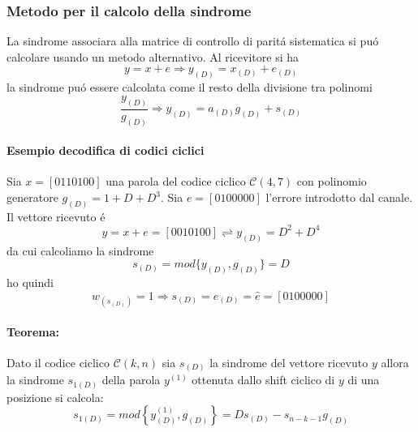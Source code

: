         \subsubsection{Metodo per il calcolo della sindrome}
            La sindrome associara alla matrice di controllo di paritá sistematica si puó calcolare
            usando un metodo alternativo. Al ricevitore si ha 
            \[
                y=x+e\Rightarrow y_{(D)} = x_{(D)}+e_{(D)}
            \]
            la sindrome puó essere calcolata come il resto della divisione tra polinomi
            \[
                \frac{y_{(D)}}{g_{(D)}}\Rightarrow y_{(D)} = a_{(D)}g_{(D)} + s_{(D)} 
            \]
            \paragraph{Esempio decodifica di codici ciclici}
                Sia $x = [0110100]$ una parola del codice ciclico $\mathcal{C}(4,7)$ con polinomio generatore 
                $g_{(D)} = 1+D+D^3$. Sia $e = [0100000]$ l'errore introdotto dal canale. Il vettore ricevuto é 
                \[
                    y= x+e = [0010100]\rightleftharpoons y_{(D)} = D^2+D^4 
                \]
                da cui calcoliamo la sindrome 
                \[
                    s_{(D)} = mod\{y_{(D)},g_{(D)}\}=D
                \]
                ho quindi 
                \[
                    w_{(s_{(D)})} = 1\Rightarrow s_{(D)} =e_{(D)} = \hat{e} = [0100000]  
                \]
            \paragraph{Teorema:} Dato il codice ciclico $\mathcal{C}(k,n)$ sia $s_{(D)}$ la sindrome del vettore ricevuto
                $y$ allora la sindrome $s_{1(D)}$ della parola $y^{(1)}$ ottenuta dallo shift ciclico di $y$ di una posizione 
                si calcola:
                \[
                    s_{1(D)} = mod\left\{y^{(1)}_{(D)},g_{(D)}\right\} = Ds_{(D)}-s_{n-k-1}g_{(D)}    
                \]
